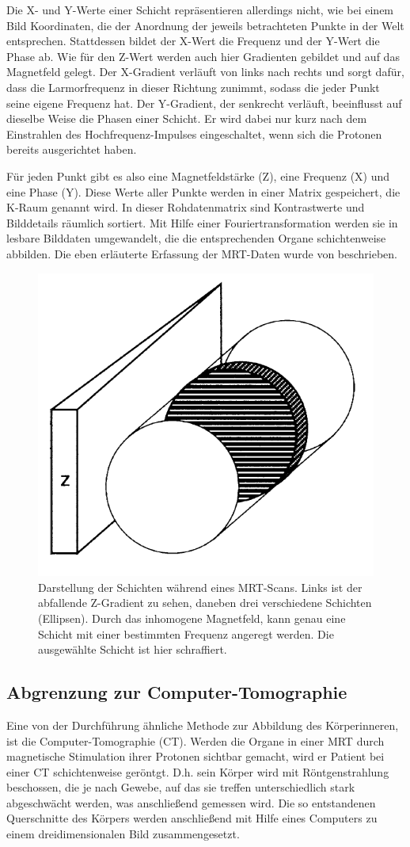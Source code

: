 Die X- und Y-Werte einer Schicht repräsentieren allerdings nicht, wie bei einem Bild Koordinaten, die der Anordnung der jeweils betrachteten Punkte in der Welt entsprechen. Stattdessen bildet der X-Wert die Frequenz und der Y-Wert die Phase ab. Wie für den Z-Wert werden auch hier Gradienten gebildet und auf das Magnetfeld gelegt. Der X-Gradient verläuft von links nach rechts und sorgt dafür, dass die Larmorfrequenz in dieser Richtung zunimmt, sodass die jeder Punkt seine eigene Frequenz hat. Der Y-Gradient, der senkrecht verläuft, beeinflusst auf dieselbe Weise die Phasen einer Schicht. Er wird dabei nur kurz nach dem Einstrahlen des Hochfrequenz-Impulses eingeschaltet, wenn sich die Protonen bereits ausgerichtet haben.

Für jeden Punkt gibt es also eine Magnetfeldstärke (Z), eine Frequenz (X) und eine Phase (Y). Diese Werte aller Punkte werden in einer Matrix gespeichert, die K-Raum genannt wird. In dieser Rohdatenmatrix sind Kontrastwerte und Bilddetails räumlich sortiert. Mit Hilfe einer Fouriertransformation werden sie in lesbare Bilddaten umgewandelt, die die entsprechenden Organe schichtenweise abbilden. 
Die eben erläuterte Erfassung der MRT-Daten wurde von \cite{weishaupt09} beschrieben.

\begin{figure}[!htb]
	\centering
	\includegraphics[width=0.3\linewidth]{images/zGradientMrt.png}
	\caption{Darstellung der Schichten während eines MRT-Scans. Links ist der abfallende Z-Gradient zu sehen, daneben drei verschiedene Schichten (Ellipsen). Durch das inhomogene Magnetfeld, kann genau eine Schicht mit einer bestimmten Frequenz angeregt werden. Die ausgewählte Schicht ist hier schraffiert.}
	\label{img:zGradient}
\end{figure}
\FloatBarrier

\subsection{Abgrenzung zur Computer-Tomographie}

Eine von der Durchführung ähnliche Methode zur Abbildung des Körperinneren, ist die Computer-Tomographie (CT). Werden die Organe in einer MRT durch magnetische Stimulation ihrer Protonen sichtbar gemacht, wird er Patient bei einer CT schichtenweise geröntgt. D.h. sein Körper wird mit Röntgenstrahlung beschossen, die je nach Gewebe, auf das sie treffen unterschiedlich stark abgeschwächt werden, was anschließend gemessen wird. Die so entstandenen Querschnitte des Körpers werden anschließend mit Hilfe eines Computers zu einem dreidimensionalen Bild zusammengesetzt. \cite{ct1}

